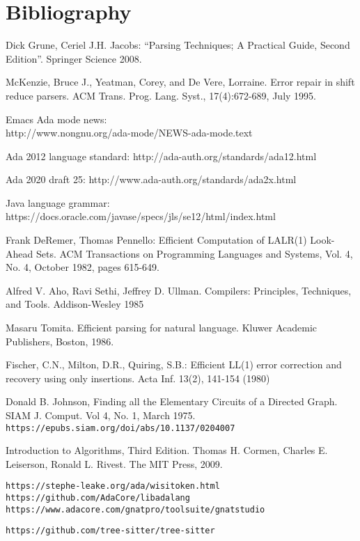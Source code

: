 \documentclass{article}
\begin{document}
\section{Bibliography}
\begin{thebibliography}{9}

 Dick Grune, Ceriel J.H. Jacobs: ``Parsing Techniques; A Practical Guide, Second
  Edition''. Springer Science  2008.

 McKenzie, Bruce J., Yeatman, Corey, and De
  Vere, Lorraine. Error repair in shift reduce parsers. ACM Trans.
  Prog. Lang. Syst., 17(4):672-689, July 1995.

Emacs Ada mode news:\\
  http://www.nongnu.org/ada-mode/NEWS-ada-mode.text

Ada 2012 language standard:
  http://ada-auth.org/standards/ada12.html

Ada 2020 draft 25: http://www.ada-auth.org/standards/ada2x.html

Java language grammar:
  https://docs.oracle.com/javase/specs/jls/se12/html/index.html

 Frank DeRemer, Thomas Pennello: Efficient
  Computation of LALR(1) Look-Ahead Sets. ACM Transactions on
  Programming Languages and Systems, Vol. 4, No. 4, October 1982,
  pages 615-649.

Alfred V. Aho, Ravi Sethi, Jeffrey D. Ullman.
  Compilers: Principles, Techniques, and Tools. Addison-Wesley 1985

 Masaru Tomita. Efficient parsing for natural language. Kluwer Academic Publishers, Boston, 1986.

  Fischer, C.N., Milton, D.R., Quiring, S.B.:
  Efficient LL(1) error correction and recovery using only insertions.
  Acta Inf. 13(2), 141-154 (1980)

 Donald B. Johnson, Finding all the Elementary Circuits of a Directed Graph.
SIAM J. Comput. Vol 4, No. 1, March 1975.\\ \verb|https://epubs.siam.org/doi/abs/10.1137/0204007|

 Introduction to Algorithms, Third Edition.
    Thomas H. Cormen, Charles E. Leiserson, Ronald L. Rivest. The MIT
    Press, 2009.

\verb|https://stephe-leake.org/ada/wisitoken.html|
\verb|https://github.com/AdaCore/libadalang|
\verb|https://www.adacore.com/gnatpro/toolsuite/gnatstudio|

\verb|https://github.com/tree-sitter/tree-sitter|

\end{thebibliography}
\end{document}
